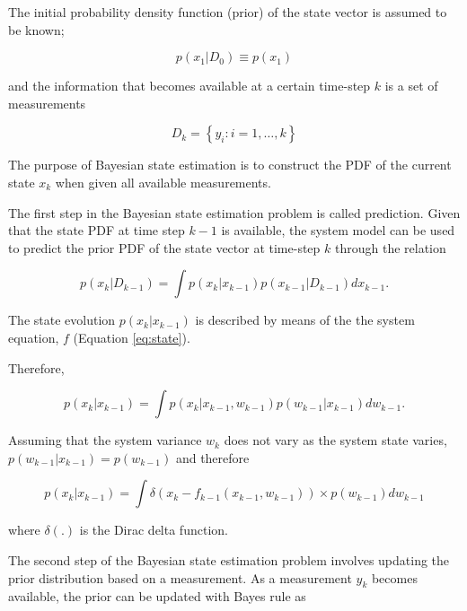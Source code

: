 The initial probability density function (prior) of the state vector is assumed to be known;

\begin{equation}
p\left(x_{1} | D_{0}\right) \equiv p\left(x_{1}\right)
\end{equation}

and the information that becomes available at a certain time-step $k$ is a set of measurements

\begin{equation}
D_{k}=\left\{y_{i} : i=1, \dots, k\right\}
\end{equation}

The purpose of Bayesian state estimation is to construct the PDF of the current state $x_k$ when given all available measurements. 

The first step in the Bayesian state estimation problem is called prediction. Given that the state PDF at time step $k-1$ is available, the system model can be used to predict the prior PDF of the state vector at time-step $k$ through the relation 

\begin{equation}
p\left(x_{k} | D_{k-1}\right)=\int p\left(x_{k} | x_{k-1}\right) p\left(x_{k-1} | D_{k-1}\right) d x_{k-1} .
\label{eq:first}
\end{equation}

The state evolution $p\left(x_{k} | x_{k-1}\right)$ is described by means of the the system equation, $f$ (Equation \ref{eq:state}).

Therefore,

\begin{equation}
p\left(x_{k} | x_{k-1}\right)=\int p\left(x_{k} | x_{k-1}, w_{k-1}\right) p\left(w_{k-1} | x_{k-1}\right) d w_{k-1}.
\end{equation}


Assuming that the system variance $w_k$ does not vary as the system state varies, $ p\left(w_{k-1} | x_{k-1}\right)=p\left(w_{k-1}\right)$ and therefore 

\begin{equation}
p\left(x_{k} | x_{k-1}\right)=\int \delta\left(x_{k}-f_{k-1}\left(x_{k-1}, w_{k-1}\right)\right)\times p\left(w_{k-1}\right) d w_{k-1}
\end{equation}


where $ \delta\left(.\right)$ is the Dirac delta function.


The second step of the Bayesian state estimation problem involves updating the prior distribution based on a measurement. As a measurement $y_k$ becomes available, the prior can be updated with Bayes rule as 

